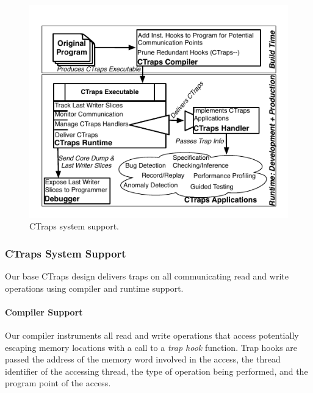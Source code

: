 \documentclass[preprint,9pt]{sigplanconf}
\newcommand{\ctraps}{CTraps\xspace}
\begin{document}
\begin{figure}[htb]
\centering
\includegraphics[width=.90\columnwidth]{figs/SystemDiagram.pdf}
\caption{\label{fig:systemdiagram}CTraps system support.}
\end{figure}



\subsubsection{\ctraps System Support} 

Our base \ctraps design delivers traps on all communicating read and write
operations using compiler and runtime support. 

\paragraph{Compiler Support}
Our compiler instruments all read and write operations that access potentially
escaping memory locations with a call to a {\em trap hook} function.  Trap hooks
are passed the address of the memory word involved in the access, the thread
identifier of the accessing thread, the type of operation being performed, and
the program point of the access.  
\end{document}
